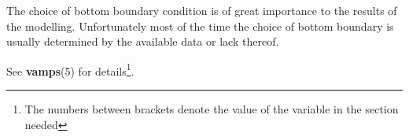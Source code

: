 The choice of bottom boundary condition is of great importance to
the results of the modelling. Unfortunately
most of the time the choice of bottom boundary is usually determined 
by the available data or lack thereof.

See {\bf vamps}(5) for details\footnote{The numbers between brackets
denote the value of the  variable in the 
section needed}.

